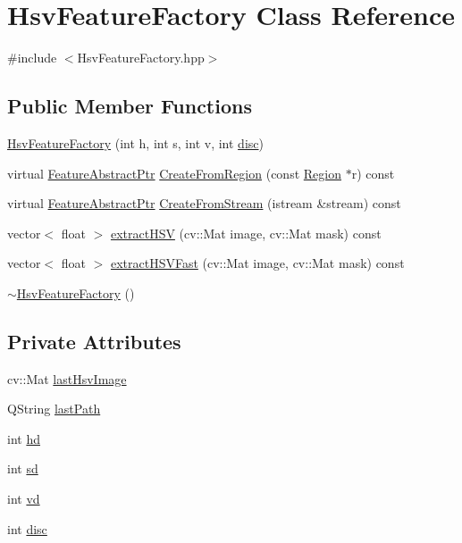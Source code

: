 \hypertarget{class_hsv_feature_factory}{\section{Hsv\+Feature\+Factory Class Reference}
\label{class_hsv_feature_factory}
}


{\ttfamily \#include $<$Hsv\+Feature\+Factory.\+hpp$>$}

\subsection*{Public Member Functions}
\begin{DoxyCompactItemize}
\item 
\hyperlink{class_hsv_feature_factory_a17f72ac377da6ee731ba5e71f9a19015}{Hsv\+Feature\+Factory} (int h, int s, int v, int \hyperlink{class_hsv_feature_factory_a6bd57065b760e5ef23c555e354c79ae6}{disc})
\item 
virtual \hyperlink{class_feature_abstract_ptr}{Feature\+Abstract\+Ptr} \hyperlink{class_hsv_feature_factory_a3ec51eeb00cf9d8a192725ce51288a95}{Create\+From\+Region} (const \hyperlink{class_region}{Region} $\ast$r) const 
\item 
virtual \hyperlink{class_feature_abstract_ptr}{Feature\+Abstract\+Ptr} \hyperlink{class_hsv_feature_factory_a3a1373d0b56dd3e5fa339351397b3927}{Create\+From\+Stream} (istream \&stream) const 
\item 
vector$<$ float $>$ \hyperlink{class_hsv_feature_factory_ac911e916c0a3ebafacba434b5d9d7a98}{extract\+H\+S\+V} (cv\+::\+Mat image, cv\+::\+Mat mask) const 
\item 
vector$<$ float $>$ \hyperlink{class_hsv_feature_factory_acf024cd2f4a38ab87d8a6afafca9a9b6}{extract\+H\+S\+V\+Fast} (cv\+::\+Mat image, cv\+::\+Mat mask) const 
\item 
\hyperlink{class_hsv_feature_factory_a17e0354f8ee4554b50c3629c8bd171bf}{$\sim$\+Hsv\+Feature\+Factory} ()
\end{DoxyCompactItemize}
\subsection*{Private Attributes}
\begin{DoxyCompactItemize}
\item 
cv\+::\+Mat \hyperlink{class_hsv_feature_factory_ad9a0b2d197a4ad50c61cdcb8d699112d}{last\+Hsv\+Image}
\item 
Q\+String \hyperlink{class_hsv_feature_factory_a1adf2c7f44d994073e6a0f41aa67d4ef}{last\+Path}
\item 
int \hyperlink{class_hsv_feature_factory_aa6c7f3bd586b6bbe1b0ae404c0220f99}{hd}
\item 
int \hyperlink{class_hsv_feature_factory_afd7c786338d314feac8a95224f0c6f7d}{sd}
\item 
int \hyperlink{class_hsv_feature_factory_a57ee7c097f73c331d22452e3a83cb9f5}{vd}
\item 
int \hyperlink{class_hsv_feature_factory_a6bd57065b760e5ef23c555e354c79ae6}{disc}
\end{DoxyCompactItemize}


